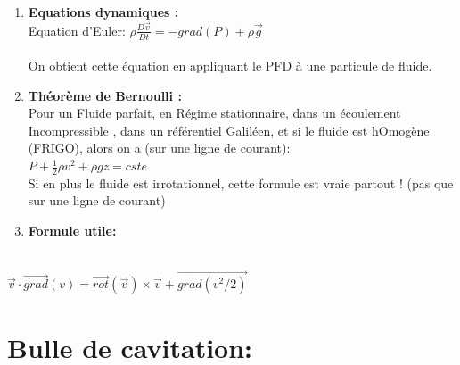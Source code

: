 \documentclass{article}
\begin{document}
\begin{enumerate}
\item \textbf{Equations dynamiques : }\\[0.1cm]

Equation d'Euler: $\rho \frac{D\vec{v}}{Dt} = -grad(P) + \rho \vec{g} $\\[0.1cm] 
\\
On obtient cette équation en appliquant le PFD à une particule de fluide. 

\item \textbf{ Théorème de Bernoulli : }\\[0.1cm]
Pour un Fluide parfait, en Régime stationnaire, dans un écoulement Incompressible , dans un référentiel Galiléen, et si le fluide est hOmogène (FRIGO),  alors on a (sur une ligne de courant): \\[0.1cm]
$P + \frac{1}{2} \rho v^2 + \rho g z = cste$\\[0.1cm]

Si en plus le fluide est irrotationnel, cette formule est vraie partout ! (pas que sur une ligne de courant)
\\[0.1cm]

\item \textbf{Formule utile: }
\end{enumerate}



\\[0.1cm]
$\vec{v} \cdot \vec{grad}(v) = \vec{rot}(\vec{v}) \times \vec{v} + \vec{grad(v^2/2)} $



\section{Bulle de cavitation:}
\end{document}
